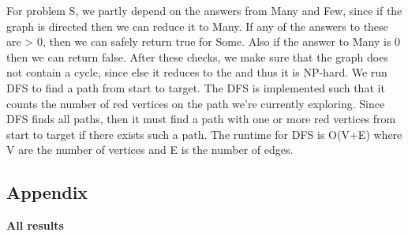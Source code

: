 \documentclass{tufte-handout}
\begin{document}
For problem S, we partly depend on the answers from Many and Few, since if the graph is directed then we can reduce it to Many. If any of the answers to these are > 0, then we can safely return true for Some. Also if the answer to Many is 0 then we can return false. After these checks, we make sure that the
graph does not contain a cycle, since else it reduces to the  and thus it is NP-hard. We run DFS to find a path from start to target. The DFS is implemented such that it counts the number of red vertices on the path we're currently exploring. Since DFS finds all paths, then it must find a path with one or more red vertices from start to target if there exists such a path. 
The runtime for DFS is O(V+E) where V are the number of vertices and E is the number of edges. 

\subsection{Appendix}
\textbf{All results}

\end{document}
